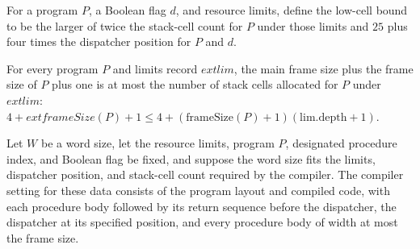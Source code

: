 \begin{definition}
\label{Light.Compiler.lowCell}
\leanok
{}
For a program $P$, a Boolean flag $d$, and resource limits, define the low-cell bound to
be the larger of twice the stack-cell count for $P$ under those limits and $25$ plus
four times the dispatcher position for $P$ and $d$.
\end{definition}

\begin{theorem}
\label{Light.Compiler.frame_le_stackCells}
\leanok
{}
For every program $P$ and limits record $	ext{lim}$, the main frame size plus the frame
size of $P$ plus one is at most the number of stack cells allocated for $P$ under
$	ext{lim}$: $4 + 	ext{frameSize}(P) + 1 \le 4 +
(\text{frameSize}(P)+1)(\text{lim.depth}+1)$.
\end{theorem}

\begin{definition}
\label{Light.Compiler.setting}
\leanok
{}
Let $W$ be a word size, let the resource limits, program $P$, designated procedure
index, and Boolean flag be fixed, and suppose the word size fits the limits, dispatcher
position, and stack-cell count required by the compiler. The compiler setting for these
data consists of the program layout and compiled code, with each procedure body followed
by its return sequence before the dispatcher, the dispatcher at its specified position,
and every procedure body of width at most the frame size.
\end{definition}

